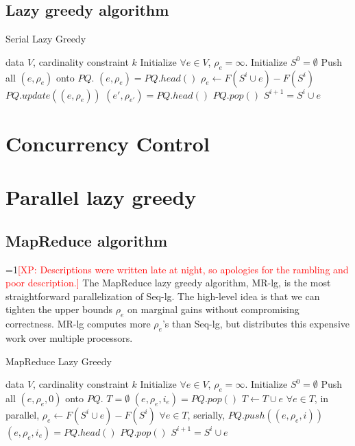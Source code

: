 \documentclass{article}
\newcommand{\Comments}{1}
\newcommand{\note}[2]{\ifnum\Comments=1\textcolor{#1}{#2}\fi}
\newcommand{\xinghao}[1]{\note{red}{[XP: #1]}}
\newcommand{\seqlz}{Seq-lg}
\newcommand{\mrlz}{MR-lg}
\begin{document}
\subsection{Lazy greedy algorithm}
\begin{algorithm}[tb]
  \caption{Serial Lazy Greedy}
  \label{alg:seqlz}
\begin{algorithmic}[1]
   data $V$, cardinality constraint $k$
  \STATE Initialize $\forall e \in V$, $\rho_e = \infty$.
  \STATE Initialize $S^0 = \emptyset$
  \STATE Push all $(e, \rho_e)$ onto $PQ$.
      \STATE $(e, \rho_e) = PQ.head()$
      \STATE $\rho_e \leftarrow F(S^i\cup e) - F(S^i)$
      \STATE $PQ.update((e,\rho_e))$
      \STATE $(e', \rho_{e'}) = PQ.head()$
        \STATE $PQ.pop()$
        \STATE $S^{i+1} = S^i \cup e$
      \ENDIF
    \ENDWHILE
  \ENDFOR
\end{algorithmic}
\end{algorithm}


\section{Concurrency Control}
\label{sec:concurrencycontrol}

\section{Parallel lazy greedy}
\label{sec:parlazy}

\subsection{MapReduce algorithm}
\xinghao{Descriptions were written late at night, so apologies for the rambling and poor description.}
The MapReduce lazy greedy algorithm, \mrlz{}, is the most straightforward parallelization of \seqlz{}.
The high-level idea is that we can tighten the upper bounds $\rho_e$ on marginal gains without compromising correctness.
\mrlz{} computes more $\rho_e$'s than \seqlz{}, but distributes this expensive work over multiple processors.
\begin{algorithm}[tb]
  \caption{MapReduce Lazy Greedy}
  \label{alg:mrlz}
\begin{algorithmic}[1]
   data $V$, cardinality constraint $k$
  \STATE Initialize $\forall e \in V$, $\rho_e = \infty$.
  \STATE Initialize $S^0 = \emptyset$
  \STATE Push all $(e, \rho_e, 0)$ onto $PQ$.
      \STATE $T = \emptyset$
        \STATE $(e, \rho_e, i_e) = PQ.pop()$
        \STATE $T \leftarrow T \cup e$
      \ENDFOR
      \STATE $\forall e \in T$, in parallel, $\rho_e \leftarrow F(S^i\cup e) - F(S^i)$
      \STATE $\forall e \in T$, serially, $PQ.push((e, \rho_e, i))$
      \STATE $(e, \rho_e, i_e) = PQ.head()$
        \STATE $PQ.pop()$
        \STATE $S^{i+1} = S^i \cup e$
      \ENDIF
    \ENDWHILE
  \ENDFOR
\end{algorithmic}
\end{algorithm}
\end{document}

